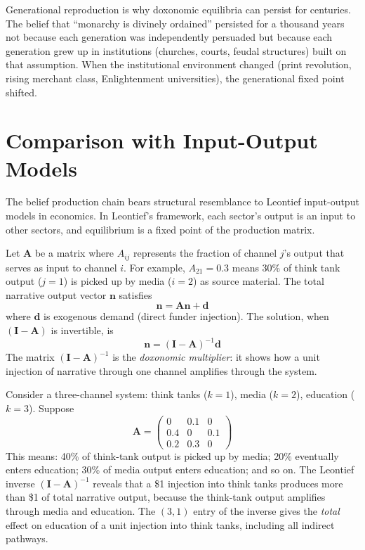 Generational reproduction is why doxonomic equilibria can persist for centuries.
The belief that ``monarchy is divinely ordained'' persisted for a thousand years not because each generation was independently persuaded but because each generation grew up in institutions (churches, courts, feudal structures) built on that assumption.
When the institutional environment changed (print revolution, rising merchant class, Enlightenment universities), the generational fixed point shifted.


\section{Comparison with Input-Output Models}
\label{sec:ch5-leontief}

The belief production chain bears structural resemblance to Leontief input-output models in economics.
In Leontief's framework, each sector's output is an input to other sectors, and equilibrium is a fixed point of the production matrix.

\begin{model}
\label{mod:input-output}
Let $\bm{A}$ be a matrix where $A_{ij}$ represents the fraction of channel $j$'s output that serves as input to channel $i$.
For example, $A_{21} = 0.3$ means 30\% of think tank output ($j=1$) is picked up by media ($i=2$) as source material.
The total narrative output vector $\bm{n}$ satisfies
\[
  \bm{n} = \bm{A}\bm{n} + \bm{d}
\]
where $\bm{d}$ is exogenous demand (direct funder injection).
The solution, when $(\bm{I} - \bm{A})$ is invertible, is
\[
  \bm{n} = (\bm{I} - \bm{A})^{-1}\bm{d}
\]
The matrix $(\bm{I} - \bm{A})^{-1}$ is the \emph{doxonomic multiplier}: it shows how a unit injection of narrative through one channel amplifies through the system.
\end{model}

\begin{example}
\label{ex:multiplier}
Consider a three-channel system: think tanks ($k=1$), media ($k=2$), education ($k=3$).
Suppose
\[
  \bm{A} = \begin{pmatrix} 0 & 0.1 & 0 \\ 0.4 & 0 & 0.1 \\ 0.2 & 0.3 & 0 \end{pmatrix}
\]
This means: 40\% of think-tank output is picked up by media; 20\% eventually enters education; 30\% of media output enters education; and so on.
The Leontief inverse $(\bm{I} - \bm{A})^{-1}$ reveals that a \$1 injection into think tanks produces more than \$1 of total narrative output, because the think-tank output amplifies through media and education.
The $(3,1)$ entry of the inverse gives the \emph{total} effect on education of a unit injection into think tanks, including all indirect pathways.
\end{example}


